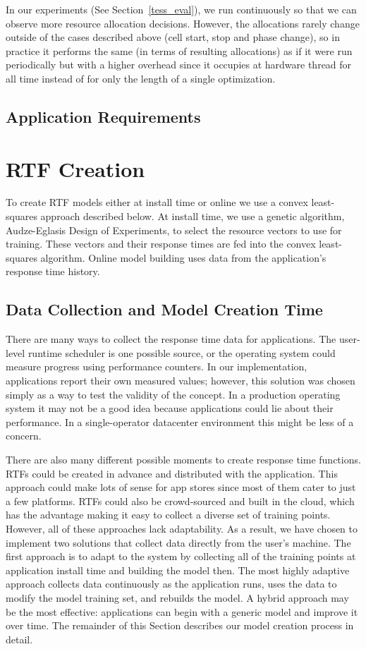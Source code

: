 In our experiments (See Section~\ref{tess_eval}), we run \pacora continuously so that we can observe more resource allocation decisions. However, the allocations rarely change outside of the cases described above (\ie cell start, stop and phase change), so in practice it performs the same (in terms of resulting allocations) as if it were run periodically but with a higher overhead since it occupies at hardware thread for all time instead of for only the length of a single optimization. 

\subsection{Application Requirements}
 

\section{RTF Creation}\label{rtf_creation}
To create RTF models either at install time or online we use a convex
least-squares approach described below.  At install time, we use a
genetic algorithm, Audze-Eglasis Design of
Experiments\cite{bates-aes03}, to select the resource vectors to use
for training.  These vectors and their response times are fed into the
convex least-squares algorithm. Online model building uses data
from the application's response time history.

\subsection*{Data Collection and Model Creation Time}
There are many ways to collect the response time data for
applications. The user-level runtime scheduler is one possible source,
or the operating system could measure progress using performance
counters.  In our implementation, applications report their own
measured values; however, this solution was chosen simply as a way to
test the validity of the concept.  In a production operating system it
may not be a good idea because applications could lie about their
performance.  In a single-operator datacenter environment this might be less of a concern.

There are also many different possible moments to create response time functions.  RTFs could be created in advance and distributed with the application. This approach could make lots of sense for app stores since most of them cater to just a few platforms. RTFs could also be crowd-sourced and built in the cloud, which has the advantage making it easy to collect a diverse set of training points.  However, all of these approaches lack adaptability.  As a result, we have chosen to implement two solutions that collect data directly from the user's machine.  The first approach is to adapt to the system by collecting all of the training points at application install time and building the model then.  The most highly adaptive approach collects data continuously as the application runs, uses the data to modify the model training set, and rebuilds the model.  A hybrid approach may be the most effective: applications can begin with a generic model and improve it over time. The remainder of this Section describes our model creation process in detail.

